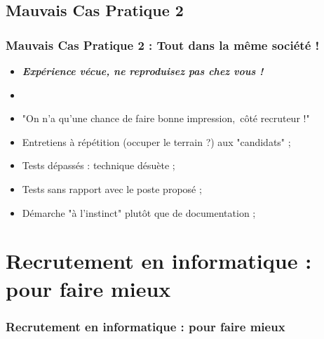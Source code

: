 \documentclass[slidetop,11pt]{beamer}
\begin{document}
\subsection{Mauvais Cas Pratique 2}
\begin{frame}
	\frametitle{Mauvais Cas Pratique 2 : Tout dans la m{\^e}me soci{\'e}t{\'e} !}
	\begin{itemize}
		\item \textbf{\emph{Exp{\'e}rience v{\'e}cue, ne reproduisez pas chez vous !}}
		\item[] 
		\item "On n'a qu'une chance de faire bonne impression,~\newline c{\^o}t{\'e} recruteur !"~\newline
		\item Entretiens {\`a} r{\'e}p{\'e}tition (occuper le terrain ?) aux "candidats" ; 
		\item Tests d{\'e}pass{\'e}s : technique d{\'e}su{\`e}te ; 
		\item Tests sans rapport avec le poste propos{\'e} ;  
		\item D{\'e}marche "{\`a} l'instinct" plut{\^o}t que de documentation ; 
	\end{itemize}
\end{frame}


\section{Recrutement en informatique : pour faire mieux}
\begin{frame}
	\frametitle{Recrutement en informatique : pour faire mieux}
	\tableofcontents[sections=4,currentsection,subsectionstyle=show/shaded/hide] %
\end{frame}
\end{document}
